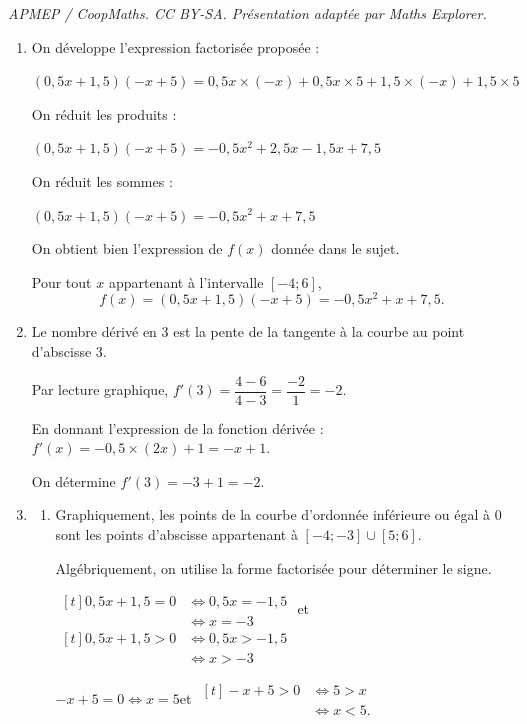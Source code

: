 \documentclass[10pt]{article}
\begin{document}
\noindent\textit{APMEP / CoopMaths. CC BY-SA. Présentation adaptée par Maths Explorer.}\par\medskip
\begin{enumerate}
	\item On développe l'expression factorisée proposée :

	$(0,5x + 1,5)(-x+5) = 0,5x \times (-x) + 0,5x \times 5 + 1,5 \times (-x) + 1,5 \times 5 $

	On réduit les produits :

	$(0,5x + 1,5)(-x+5) = -0,5x^2 + 2,5x - 1,5x + 7,5 $

	On réduit les sommes :

	$(0,5x + 1,5)(-x+5) = -0,5x^2 + x + 7,5 $

	On obtient bien l'expression de $f(x)$ donnée dans le sujet.

	Pour tout $x$ appartenant à l'intervalle $[-4 ; 6]$,
	\[
	f(x)=(0,5x + 1,5)(-x+5) = -0,5x^2 +  x + 7,5.
	\]

	\item Le nombre dérivé en 3 est la pente de la tangente à la courbe au point d'abscisse 3.

	Par lecture graphique, \quad $f'(3) = \dfrac{4 - 6}{4 - 3} = \dfrac{-2}{1} = -2$.

	En donnant l'expression de la fonction dérivée : \quad $f'(x) = -0,5 \times (2x) + 1 = -x+1$.

	On détermine \quad $f'(3) = -3  + 1 = -2$.


	\item \begin{enumerate}
		\item Graphiquement, les points de la courbe d'ordonnée inférieure ou égal à 0 sont les points d'abscisse appartenant à $\left[-4 ; -3\right]\cup\left[5 ; 6\right]$.

		Algébriquement, on utilise la forme factorisée pour déterminer le signe.

		$\begin{aligned}[t]
			0,5x + 1,5 = 0
			&\iff 0,5x = -1,5 \\
			&\iff x = -3
		\end{aligned}$
		\quad et \quad
		$\begin{aligned}[t]
			0,5x + 1,5 > 0
			&\iff 0,5x > -1,5 \\
			&\iff x > -3
		\end{aligned}$

		$-x+5 = 0 \iff x = 5$\quad  et  \quad $\begin{aligned}[t]
			-x+5 > 0 &\iff 5 > x \\&\iff x < 5.
		\end{aligned}$


\end{enumerate}
\end{enumerate}
\end{document}
